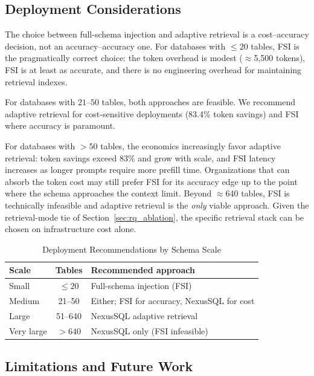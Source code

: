 \documentclass[conference]{IEEEtran}
\begin{document}
\subsection{Deployment Considerations}

The choice between full-schema injection and adaptive retrieval is a
cost--accuracy decision, not an accuracy--accuracy one. For databases
with $\leq 20$ tables, FSI is the pragmatically correct choice: the
token overhead is modest ($\approx$5,500 tokens), FSI is at least as
accurate, and there is no engineering overhead for maintaining
retrieval indexes.

For databases with $21$--$50$ tables, both approaches are feasible.
We recommend adaptive retrieval for cost-sensitive deployments
(83.4\% token savings) and FSI where accuracy is paramount.

For databases with $>50$ tables, the economics increasingly favor
adaptive retrieval: token savings exceed 83\% and grow with scale,
and FSI latency increases as longer prompts require more prefill time.
Organizations that can absorb the token cost may still prefer FSI for
its accuracy edge up to the point where the schema approaches the
context limit. Beyond $\approx$640 tables, FSI is technically
infeasible and adaptive retrieval is the \emph{only} viable approach.
Given the retrieval-mode tie of Section~\ref{sec:rq_ablation}, the
specific retrieval stack can be chosen on infrastructure cost alone.

\begin{table}[!htb]
\caption{Deployment Recommendations by Schema Scale}
\label{tab:deploy}
\centering
\small
\begin{tabular}{lcl}
\toprule
\textbf{Scale} & \textbf{Tables} & \textbf{Recommended approach} \\
\midrule
Small      & $\leq 20$   & Full-schema injection (FSI) \\
Medium     & 21--50      & Either; FSI for accuracy, NexusSQL for cost \\
Large      & 51--640     & NexusSQL adaptive retrieval \\
Very large & $> 640$     & NexusSQL only (FSI infeasible) \\
\bottomrule
\end{tabular}
\end{table}

\subsection{Limitations and Future Work}
\end{document}
